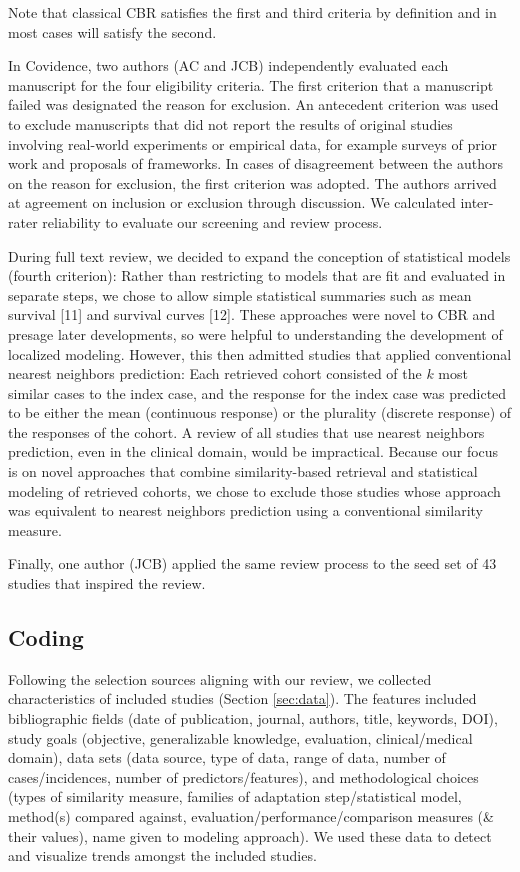 \documentclass[preprint, 3p,
authoryear]{elsarticle} %
\begin{document}
Note that classical CBR satisfies the first and third criteria by
definition and in most cases will satisfy the second.

In Covidence, two authors (AC and JCB) independently evaluated each
manuscript for the four eligibility criteria. The first criterion that a
manuscript failed was designated the reason for exclusion. An antecedent
criterion was used to exclude manuscripts that did not report the
results of original studies involving real-world experiments or
empirical data, for example surveys of prior work and proposals of
frameworks. In cases of disagreement between the authors on the reason
for exclusion, the first criterion was adopted. The authors arrived at
agreement on inclusion or exclusion through discussion. We calculated
inter-rater reliability to evaluate our screening and review process.

During full text review, we decided to expand the conception of
statistical models (fourth criterion): Rather than restricting to models
that are fit and evaluated in separate steps, we chose to allow simple
statistical summaries such as mean survival {[}11{]} and survival curves
{[}12{]}. These approaches were novel to CBR and presage later
developments, so were helpful to understanding the development of
localized modeling. However, this then admitted studies that applied
conventional nearest neighbors prediction: Each retrieved cohort
consisted of the \(k\) most similar cases to the index case, and the
response for the index case was predicted to be either the mean
(continuous response) or the plurality (discrete response) of the
responses of the cohort. A review of all studies that use nearest
neighbors prediction, even in the clinical domain, would be impractical.
Because our focus is on novel approaches that combine similarity-based
retrieval and statistical modeling of retrieved cohorts, we chose to
exclude those studies whose approach was equivalent to nearest neighbors
prediction using a conventional similarity measure.

Finally, one author (JCB) applied the same review process to the seed
set of 43 studies that inspired the review.

\hypertarget{coding}{%
\subsection{Coding}\label{coding}}

Following the selection sources aligning with our review, we collected
characteristics of included studies (Section \ref{sec:data}). The
features included bibliographic fields (date of publication, journal,
authors, title, keywords, DOI), study goals (objective, generalizable
knowledge, evaluation, clinical/medical domain), data sets (data source,
type of data, range of data, number of cases/incidences, number of
predictors/features), and methodological choices (types of similarity
measure, families of adaptation step/statistical model, method(s)
compared against, evaluation/performance/comparison measures (\& their
values), name given to modeling approach). We used these data to detect
and visualize trends amongst the included studies.
\end{document}
